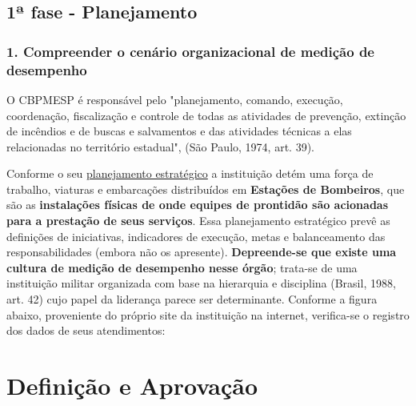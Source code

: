 \documentclass[
  letterpaper,
  DIV=11,
  numbers=noendperiod]{scrreprt}
\begin{document}

\hypertarget{uxaa-fase---planejamento-1}{%
\section*{1ª fase - Planejamento}\label{uxaa-fase---planejamento-1}}


\hypertarget{compreender-o-cenuxe1rio-organizacional-de-mediuxe7uxe3o-de-desempenho-1}{%
\subsection*{1. Compreender o cenário organizacional de medição de
desempenho}\label{compreender-o-cenuxe1rio-organizacional-de-mediuxe7uxe3o-de-desempenho-1}}

O CBPMESP é responsável pelo "planejamento, comando, execução,
coordenação, fiscalização e controle de todas as atividades de
prevenção, extinção de incêndios e de buscas e salvamentos e das
atividades técnicas a elas relacionadas no território estadual", (São
Paulo, 1974, art. 39).

Conforme o seu
\href{http://www.ccb.policiamilitar.sp.gov.br/portalcb/_institucional/midias/Planejamento-Estrate\%CC\%81gico-14DEZ20.pdf}{planejamento
estratégico} a instituição detém uma força de trabalho, viaturas e
embarcações distribuídos em \textbf{Estações de Bombeiros}, que são as
\textbf{instalações físicas de onde equipes de prontidão são acionadas
para a prestação de seus serviços}. Essa planejamento estratégico prevê
as definições de iniciativas, indicadores de execução, metas e
balanceamento das responsabilidades (embora não os apresente).
\textbf{Depreende-se que existe uma cultura de medição de desempenho
nesse órgão}; trata-se de uma instituição militar organizada com base na
hierarquia e disciplina (Brasil, 1988, art. 42) cujo papel da liderança
parece ser determinante. Conforme a figura abaixo, proveniente do
próprio site da instituição na internet, verifica-se o registro dos
dados de seus atendimentos:

\hypertarget{definiuxe7uxe3o-e-aprovauxe7uxe3o}{%
\chapter*{Definição e
Aprovação}\label{definiuxe7uxe3o-e-aprovauxe7uxe3o}}
\end{document}
